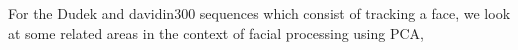 
For the Dudek and davidin300 sequences which consist of tracking a face, we look at some related areas in the context of facial processing using PCA, 

